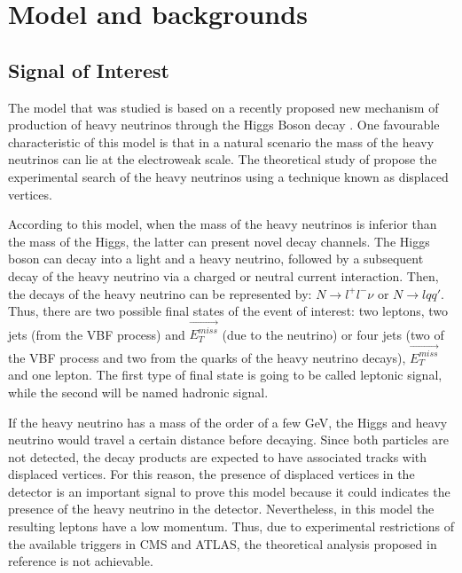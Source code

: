 \chapter{Model and backgrounds}
\label{Model_chapter}
 
\section{Signal of Interest}

The model that was studied is based on a recently proposed new mechanism of production of heavy neutrinos through the Higgs Boson decay \cite{Seesaw Mechanism with displaced vertices}. One
favourable characteristic of this model is that in a natural scenario the mass of the heavy neutrinos can lie at the electroweak scale. The theoretical study of \cite{Seesaw Mechanism with displaced vertices}
propose the experimental search of the heavy neutrinos using a technique known as displaced vertices.

According to this model, when the mass of the heavy neutrinos is inferior than the mass of the Higgs, the latter can present novel decay channels. The Higgs boson can decay into a light and a heavy
neutrino, followed by a subsequent decay of the heavy neutrino via a charged or neutral current interaction. Then, the decays of the heavy neutrino can be represented by: $N \rightarrow l^+ l^- \nu$
or $N \rightarrow l q q'$. Thus, there are two possible final states of the event of interest: two leptons, two jets (from the VBF process) and $\vec{E_T^{miss}}$ (due to the neutrino) or four jets 
(two of the VBF process and two from the quarks of the heavy neutrino decays), $\vec{E_T^{miss}}$ and one lepton. The first type of final state is going to be called leptonic signal, while the second
will be named hadronic signal.

If the heavy neutrino has a mass of the order of a few GeV, the Higgs and heavy neutrino would travel a certain distance before decaying. Since both particles are not detected, the decay products 
are expected to have associated tracks with displaced vertices. For this reason, the presence of displaced vertices in the detector is an important signal to prove this model because it could 
indicates the presence of the heavy neutrino in the detector. Nevertheless, in this model the resulting leptons have a low momentum. Thus, due to experimental restrictions of the available triggers
in CMS and ATLAS, the theoretical analysis proposed in reference \cite{Seesaw Mechanism with displace vertices} is not achievable.  

